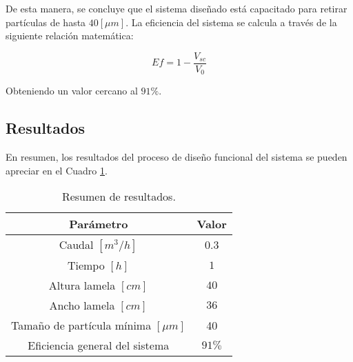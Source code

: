 De esta manera, se concluye que el sistema dise\~nado est\'a capacitado para retirar part\'iculas de hasta $40 [\mu m]$. La eficiencia del sistema se calcula a trav\'es de la siguiente relaci\'on matem\'atica:

\begin{equation}
	Ef = 1 - \frac{V_{sc}}{V_0}
\end{equation} 

\noindent
\justify

Obteniendo un valor cercano al $91 \%$.

\newpage

\subsection{Resultados}

\noindent
\justify

En resumen, los resultados del proceso de dise\~no funcional del sistema se pueden apreciar en el Cuadro \ref{resul_dis}.

\begin{table}[h!]
	\centering
	\begin{tabular}{c|c}
		\hline
		\textbf{Par\'ametro} & \textbf{Valor} \\ \hline
		Caudal $\left[m^3 /h \right]$ & $0.3$ \\ \hline
		Tiempo $[h]$ & $1$ \\ \hline
		Altura lamela $[cm]$ & $40$ \\ \hline
		Ancho lamela $[cm]$ & $36$ \\ \hline
		Tama\~no de part\'icula m\'inima $[\mu m]$ & 40 \\ \hline
		Eficiencia general del sistema & $91 \%$ \\ \hline
	\end{tabular}
	\caption{Resumen de resultados.}
	\label{resul_dis}
\end{table}

\noindent
\justify

